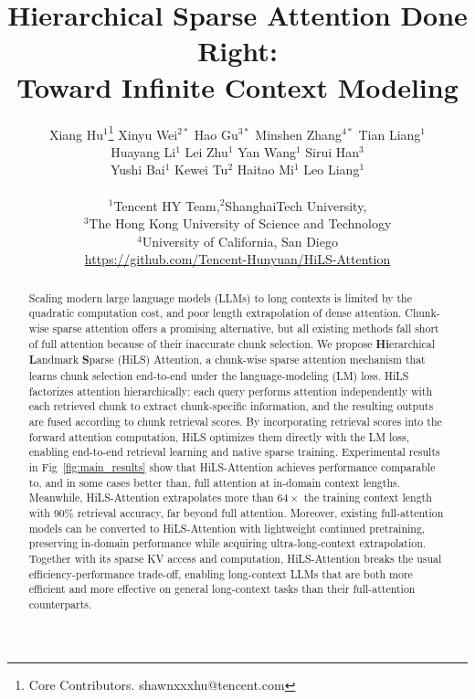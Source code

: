 \documentclass{article}
\title{Hierarchical Sparse Attention Done Right: \\Toward Infinite Context Modeling}
\author{
\begin{tabular}{c}
Xiang Hu$^1$\thanks{Core Contributors. shawnxxxhu@tencent.com} \quad Xinyu Wei$^{2*}$ \quad Hao Gu$^{3*}$ \quad Minshen Zhang$^{4*}$ \quad Tian Liang$^1$ \\
Huayang Li$^1$ \quad Lei Zhu$^1$ \quad Yan Wang$^1$ \quad Sirui Han$^3$ \quad \\
Yushi Bai$^1$ \quad Kewei Tu$^2$ \quad Haitao Mi$^1$ \quad Leo Liang$^1$
\end{tabular}\\
$^1$Tencent HY Team,\quad $^2$ShanghaiTech University, \quad \\$^3$The Hong Kong University of Science and Technology \quad \\ $^4$University of California, San Diego \\
\url{https://github.com/Tencent-Hunyuan/HiLS-Attention}
}
\begin{document}
\maketitle



\newpage
\begin{abstract}
Scaling modern large language models (LLMs) to long contexts is limited by the quadratic computation cost, and poor length extrapolation of dense attention. Chunk-wise sparse attention offers a promising alternative, but all existing methods fall short of full attention because of their inaccurate chunk selection.
We propose \textbf{Hi}erarchical \textbf{L}andmark \textbf{S}parse (HiLS) Attention, a chunk-wise sparse attention mechanism that learns chunk selection end-to-end under the language-modeling (LM) loss. HiLS factorizes attention hierarchically: each query performs attention independently with each retrieved chunk to extract chunk-specific information, and the resulting outputs are fused according to chunk retrieval scores. By incorporating retrieval scores into the forward attention computation, HiLS optimizes them directly with the LM loss, enabling end-to-end retrieval learning and native sparse training.
Experimental results in Fig~\ref{fig:main_results} show that HiLS-Attention achieves performance comparable to, and in some cases better than, full attention at in-domain context lengths. Meanwhile, HiLS-Attention extrapolates more than $64\times$ the training context length with 90\% retrieval accuracy, far beyond full attention. Moreover, existing full-attention models can be converted to HiLS-Attention with lightweight continued pretraining, preserving in-domain performance while acquiring ultra-long-context extrapolation. Together with its sparse KV access and computation, HiLS-Attention breaks the usual efficiency-performance trade-off, enabling long-context LLMs that are both more efficient and more effective on general long-context tasks than their full-attention counterparts.
\end{abstract}






 


\clearpage
{
	\small
	
	
}

\clearpage
\appendix

\end{document}
